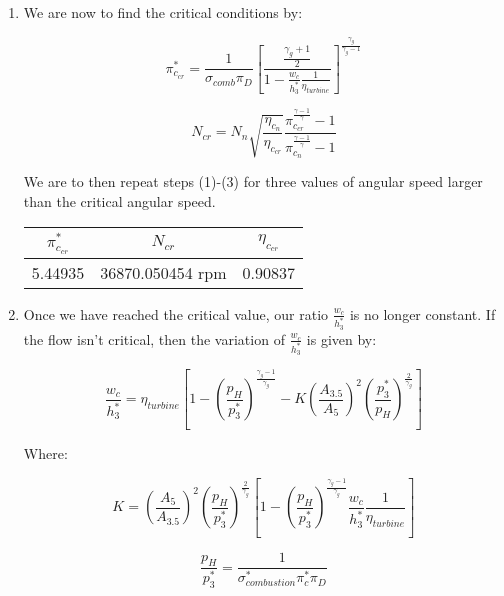 \documentclass[12pt,english]{article}
\begin{document}
\begin{enumerate}
  \item We are now to find the critical conditions by:
  
  \begin{equation}
    \pi_{c_{cr}}^{*} = \frac{1}{\sigma_{comb} \pi_{D}} \left[ \frac{\frac{\gamma_{g}+1}{2}}{1 - \frac{w_{c}}{h_{3}^{*}} \frac{1}{\eta_{turbine}}} \right]^{\frac{\gamma_{g}}{\gamma_{g}-1}}
  \end{equation}

  \begin{equation}
    N_{cr} = N_{n} \sqrt{\frac{\eta_{c_{n}}}{\eta_{c_{cr}}}} \frac{\pi_{c_{cr}}^{\frac{\gamma - 1}{\gamma}} -1}{\pi_{c_{n}}^{\frac{\gamma -1}{\gamma}} - 1}
  \end{equation}

  We are to then repeat steps (1)-(3) for three values of angular speed
  larger than the critical angular speed.

  \begin{center}
    \begin{tabular}{|c|c|c|}
      \hline
      $\pi_{c_{cr}}^{*}$ & $N_{cr}$ & $\eta_{c_{cr}}$ \\
      \hline
      5.44935 & 36870.050454 rpm & 0.90837 \\
      \hline
    \end{tabular}
  \end{center}

  \item Once we have reached the critical value, our ratio $\frac{w_{c}}{h_{3}^{*}}$ is no longer constant. If the flow isn't critical,
  then the variation of $\frac{w_{c}}{h_{3}^{*}}$ is given by:

  \begin{equation}
    \frac{w_{c}}{h_{3}^{*}} = \eta_{turbine} \left[ 1 - \left(\frac{p_{H}}{p_{3}^{*}}\right)^{\frac{\gamma_{g}-1}{\gamma_{g}}} - K \left(\frac{A_{3.5}}{A_{5}}\right)^{2} \left(\frac{p_{3}^{*}}{p_{H}}\right)^{\frac{2}{\gamma_{g}}} \right] 
  \end{equation}
  
  Where:

  \begin{equation}
    K = \left(\frac{A_{5}}{A_{3.5}}\right)^{2} \left(\frac{p_{H}}{p_{3}^{*}}\right)^{\frac{2}{\gamma_{g}}}\left[1 - \left(\frac{p_{H}}{p_{3}^{*}}\right)^{\frac{\gamma_{g}-1}{\gamma_{g}}} \frac{w_{c}}{h_{3}^{*}} \frac{1}{\eta_{turbine}}\right] 
  \end{equation}

  \begin{equation}
    \frac{p_{H}}{p_{3}^{*}} = \frac{1}{\sigma_{combustion}^{*} \pi_{c}^{*} \pi_{D}}
  \end{equation}


\end{enumerate}
\end{document}
